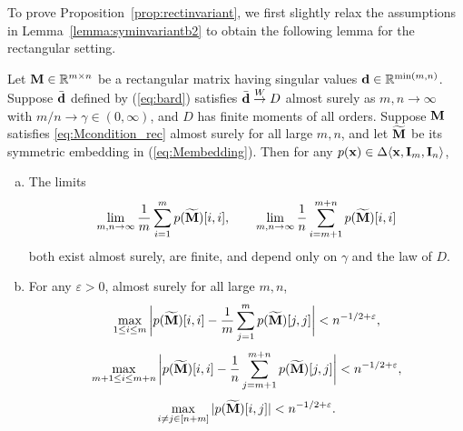 \documentclass[10pt,reqno]{amsart}
\def\toW{\overset{W}{\to}}
\def\bx{\mathbf{x}}
\def\eps{\varepsilon}
\begin{document}
To prove Proposition~\ref{prop:rectinvariant}, we first slightly relax the 
assumptions in Lemma~\ref{lemma:syminvariantb2} to 
obtain the following lemma for the rectangular setting.

\begin{lemma}\label{lemma:recinvariantb2}
Let $\mathbf{M}\in\mathbb{R}^{m\times n}$ be a rectangular matrix having singular values 
$\mathbf{d}\in\mathbb{R}^{\min(m,n)}$.
Suppose $\bar{\mathbf{d}}$ defined by (\ref{eq:bard}) satisfies
$\bar\bd \toW D$ almost surely as $m,n \to \infty$ with $m/n \to \gamma \in
(0,\infty)$, and $D$ has finite moments of all orders.
Suppose $\mathbf{M}$ satisfies \eqref{eq:Mcondition_rec} almost surely for all large
$m,n$, and let $\widetilde{\mathbf{M}}$ be its symmetric embedding in
(\ref{eq:Membedding}).
Then for any $p(\bx)\in\Delta\langle\bx,\bI_m,\bI_n\rangle$, 
\begin{enumerate}[(a)]
\item The limits
\[\lim_{m,n \to \infty} \frac{1}{m}\sum_{i=1}^m
p(\widetilde{\mathbf{M}})[i,i],
\qquad \lim_{m,n \to \infty} \frac{1}{n}\sum_{i=m+1}^{m+n}
p(\widetilde{\mathbf{M}})[i,i]\]
both exist almost surely, are finite, and depend only on $\gamma$
and the law of $D$.
\item For any $\eps>0$, almost surely for all large $m,n$,
\[\max_{1 \leq i \leq m}
\bigg|p(\widetilde\bM)[i,i]-\frac{1}{m}\sum_{j=1}^m
p(\widetilde\bM)[j,j]\bigg|<n^{-1/2+\eps},\]
\[\max_{m+1 \leq i \leq m+n} \bigg|p(\widetilde\bM)[i,i]-\frac{1}{n}
\sum_{j=m+1}^{m+n} p(\widetilde\bM)[j,j]\bigg|<n^{-1/2+\eps},\]
\[\max_{i \neq j \in [n+m]} |p(\widetilde\bM)[i,j]|<n^{-1/2+\eps}.\]
\end{enumerate}
\end{lemma}
\end{document}
